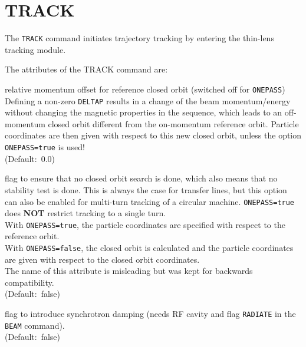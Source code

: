 \section{TRACK}
\label{sec:track}

The \texttt{TRACK} command initiates trajectory tracking by entering the 
thin-lens tracking module. 


The attributes of the TRACK command are:

\begin{madlist}
   relative momentum offset for reference closed orbit (switched
  off for \texttt{ONEPASS}) \\  
  Defining a non-zero \texttt{DELTAP} results in a change of the beam
  momentum/energy without changing the magnetic properties in the
  sequence, which leads to an off-momentum closed orbit different from
  the on-momentum reference orbit. Particle coordinates are then given
  with respect to this new closed orbit, unless the option
  \texttt{ONEPASS=true} is used! \\  
  (Default:~0.0)

   flag to ensure that no closed orbit search is done,
  which also means that no stability test is done. This is always the
  case for transfer lines, but this option can also be enabled for
  multi-turn tracking of a circular machine. \texttt{ONEPASS=true} does
  \textbf{NOT} restrict tracking to a single turn. \\
  With \texttt{ONEPASS=true}, the particle coordinates are specified with
  respect to the reference orbit. \\  
  With \texttt{ONEPASS=false}, the closed orbit is calculated and the particle
  coordinates are given with respect to the closed orbit coordinates.\\
  The name of this attribute is misleading but was kept for backwards
  compatibility.  \\ 
  (Default:~false)

   flag to introduce synchrotron damping (needs RF cavity
  and flag \texttt{RADIATE} in the \texttt{BEAM} command). \\ (Default:~false)


\end{madlist}
